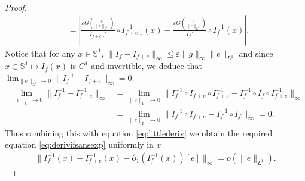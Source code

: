 \documentclass[12pt]{article}
\newcommand{\eps}{\varepsilon}
\theoremstyle{plain}
\begin{document}
{\begin{proof}
\begin{align}
    &=\left|\frac{\eps G (\frac{e}{\|e\|_{L^1}})}{I_{f+e'_x}'}\circ  I_{f+e'_x}^{-1}(x)-\frac{\eps G (\frac{e}{\|e\|_{L^1}})}{I_f'}\circ  I_f^{-1}(x)\right|,\label{eq:littlederiv}
\end{align}
Notice that for any $x\in \mathbb S^1$, $\|I_f-I_{f+e}\|_\infty\leq \eps\|g\|_\infty \|e\|_{L^1}$
and since $x\in \mathbb S^1\mapsto I_f(x)$ is $C^1$ and invertible, we deduce that $\lim_{\|e\|_{L^1}\to 0}\|I_f^{-1}-I_{f+e}^{-1}\|_\infty=0$.
\begin{align*}
    \lim_{\|e\|_{L^1}\to 0}\|I_f^{-1}-I_{f+e}^{-1}\|_{\infty}&=\lim_{\|e\|_{L^1}\to 0}\|I_{f}^{-1}\circ I_{f+e}\circ I_{f+e}^{-1}-I_{f}^{-1}\circ I_{f}\circ I_{f+e}^{-1}\|_\infty\\
    &=\lim_{\|e\|_{L^1}\to 0}\|I_{f}^{-1}\circ I_{f+e}-I_{f}^{-1}\circ I_{f}\|_\infty=0.
\end{align*}
Thus combining this with equation \eqref{eq:littlederiv} we obtain the required equation \eqref{eq:derivifsansexp} uniformly in $x$
\begin{align*}
    \|I_f^{-1}(x)-I_{f+e}^{-1}(x)-\partial_1(I_f^{-1}(x))[e]\|_\infty=o(\|e\|_{L^1}).
\end{align*}



\end{proof}}
\end{document}
